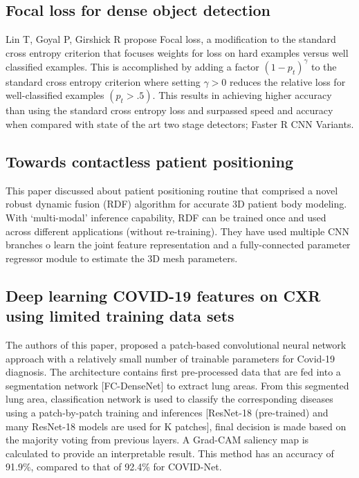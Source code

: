 \documentclass{sigkddExp}
\begin{document}
\subsection{Focal loss for dense object detection}\cite{lin2018focal}
Lin T, Goyal P, Girshick R propose Focal loss, a modification to the standard cross
entropy criterion that focuses weights for loss on hard examples versus well
classified examples. This is accomplished by adding a factor $(1 - p_t)^\gamma$ to the
standard cross entropy criterion where setting $\gamma  > 0$ reduces the relative loss 
for well-classified examples $(p_t > .5)$. This results in achieving higher accuracy 
than using the standard cross entropy loss and surpassed speed and accuracy when 
compared with state of the art two stage detectors; Faster R CNN Variants.


\subsection{Towards contactless patient positioning}\cite{9084097}
This paper discussed about patient positioning routine that comprised a novel robust 
dynamic fusion (RDF) algorithm for accurate 3D patient body modeling. 
With ‘multi-modal’ inference capability, RDF can be trained once and used across 
different applications (without re-training). They have used multiple CNN branches 
o learn the joint feature representation and a fully-connected parameter regressor 
module to estimate the 3D mesh parameters.


\subsection{Deep learning COVID-19 features on CXR using limited training data sets}\cite{pmid32396075}
The authors of this paper, proposed a patch-based convolutional neural network approach
with a relatively small number of trainable parameters for Covid-19 diagnosis.
The architecture contains first pre-processed data that are fed into a segmentation
network [FC-DenseNet] to extract lung areas. From this segmented lung area, classification
network is used to classify the corresponding diseases using a patch-by-patch training
and inferences [ResNet-18 (pre-trained) and many ResNet-18 models are used for K patches],
final decision is made based on the majority voting from previous layers. A Grad-CAM
saliency map is calculated to provide an interpretable result. This method has an accuracy
of 91.9\%, compared to that of 92.4\% for COVID-Net.
\end{document}
